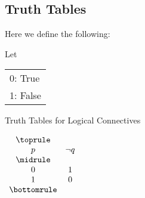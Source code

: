 \documentclass[../../../main.tex]{subfiles}
\begin{document}
\subsection{Truth Tables}

Here we define the following:

Let

\begin{tabular}{@{}l}
    0: True \\
    1: False
\end{tabular}


\begin{table}[!htb]
    \caption{Truth Tables for Logical Connectives}
    \begin{subtable}{0.5\linewidth}

    $\begin{array}{ *{2}{c} }
        \toprule \\
        p & \neg q \\
        \midrule \\
        0 & 1 \\
        1 & 0 \\
        \bottomrule
    \end{array}$
    \caption{Negation}
    \label{tbl:logical-negation}
\end{subtable}%



\end{table}
\end{document}
